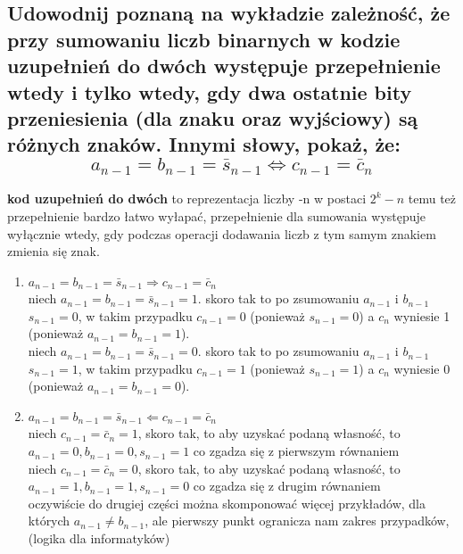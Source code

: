 \documentclass{article}
\begin{document}
\begin{enumerate}
	\section{Udowodnij poznaną na wykładzie zależność, że przy sumowaniu liczb binarnych w kodzie uzupełnień do dwóch występuje przepełnienie wtedy i tylko wtedy, gdy dwa ostatnie bity przeniesienia (dla znaku oraz wyjściowy) są różnych znaków. Innymi słowy, pokaż, że:\\ $$a_{n-1}= b_{n-1} = \bar s_{n-1} \Leftrightarrow c_{n-1} = \bar{c}_n$$}
	\textbf{kod uzupełnień do dwóch} to reprezentacja liczby -n w postaci $2^k - n$
	temu też przepełnienie bardzo łatwo wyłapać, przepełnienie dla sumowania występuje wyłącznie wtedy, gdy podczas operacji dodawania liczb z tym samym znakiem zmienia się znak.
	\begin{enumerate}
	\item $a_{n-1}= b_{n-1} = \bar s_{n-1} \Rightarrow c_{n-1} = \bar{c}_n$\\
	niech $a_{n-1}= b_{n-1} = \bar s_{n-1} = 1$. skoro tak to po zsumowaniu $a_{n-1}$ i $b_{n-1}$ $s_{n-1} = 0$, w takim przypadku $c_{n-1} = 0$ (ponieważ $s_{n-1} = 0$) a $c_{n}$ wyniesie 1 (ponieważ $a_{n-1}=b_{n-1}=1$).\\
	niech $a_{n-1}= b_{n-1} = \bar s_{n-1} = 0$. skoro tak to po zsumowaniu $a_{n-1}$ i $b_{n-1}$ $s_{n-1} = 1$, w takim przypadku $c_{n-1} = 1$ (ponieważ $s_{n-1} = 1$) a $c_{n}$ wyniesie 0 (ponieważ $a_{n-1}=b_{n-1}=0$).\\
	\item $a_{n-1}= b_{n-1} = \bar s_{n-1} \Leftarrow c_{n-1} = \bar{c}_n$\\
	niech $c_{n-1} = \bar{c}_n = 1$, skoro tak, to aby uzyskać podaną własność, to $a_{n-1} = 0, b_{n-1} = 0, s_{n-1} = 1$ co zgadza się z pierwszym równaniem\\
	niech $c_{n-1} = \bar{c}_n = 0$, skoro tak, to aby uzyskać podaną własność, to $a_{n-1} = 1, b_{n-1} = 1, s_{n-1} = 0$ co zgadza się z drugim równaniem\\
	oczywiście do drugiej części można skomponować więcej przykładów, dla których $a_{n-1} \neq b_{n-1}$, ale pierwszy punkt ogranicza nam zakres przypadków, (logika dla informatyków)

\end{enumerate}
\end{enumerate}
\end{document}
